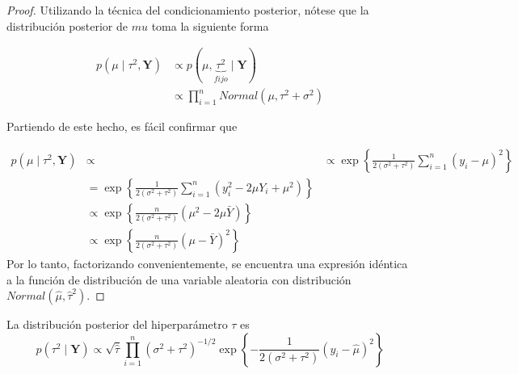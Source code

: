 \begin{proof}
Utilizando la técnica del condicionamiento posterior, nótese que la distribución posterior de $mu$ toma la siguiente forma

\begin{align*}
p(\mu \mid \tau^2,\mathbf{Y})&\propto p(\mu,\underbrace{\tau^2}_{fijo} \mid \mathbf{Y}) \\
&\propto \prod_{i=1}^n Normal(\mu,\tau^2+\sigma^2)
\end{align*}

Partiendo de este hecho, es fácil confirmar que

\begin{align*}
p(\mu \mid \tau^2,\mathbf{Y})&\propto
&\propto \exp\left\{\frac{1}{2(\sigma^2+\tau^2)}\sum_{i=1}^n(y_i-\mu)^2\right\}\\
&= \exp\left\{\frac{1}{2(\sigma^2+\tau^2)}\sum_{i=1}^n(y_i^2-2\mu Y_i+\mu^2)\right\}\\
&\propto \exp\left\{\frac{n}{2(\sigma^2+\tau^2)}(\mu^2-2\mu\bar{Y})\right\}\\
&\propto \exp\left\{\frac{n}{2(\sigma^2+\tau^2)}(\mu-\bar{Y})^2\right\}
\end{align*}
Por lo tanto, factorizando convenientemente, se encuentra una expresión idéntica a la
función de distribución de una variable aleatoria con distribución $Normal(\hat{\mu},\hat{\tau}^2)$.
\end{proof}

\begin{Res}
La distribución posterior del hiperparámetro $\tau$ es
\begin{equation*}
p(\tau^2 \mid \mathbf{Y})
\propto \sqrt{\hat{\tau}} \prod_{i=1}^n (\sigma^2+\tau^2)^{-1/2}\exp\left\{-\frac{1}{2(\sigma^2+\tau^2)}(y_i-\hat{\mu})^2\right\}
\end{equation*}
\end{Res}

